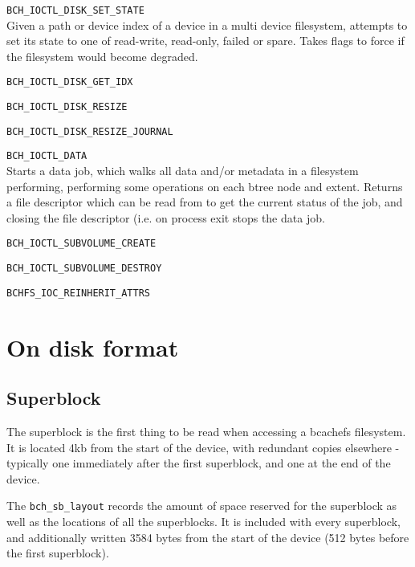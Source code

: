 \documentclass{article}
\begin{document}
\begin{description}
	\item \texttt{BCH\_IOCTL\_DISK\_SET\_STATE} \\
		Given a path or device index of a device in a multi device
		filesystem, attempts to set its state to one of read-write,
		read-only, failed or spare. Takes flags to force if the
		filesystem would become degraded.

	\item \texttt{BCH\_IOCTL\_DISK\_GET\_IDX} \\
	\item \texttt{BCH\_IOCTL\_DISK\_RESIZE} \\
	\item \texttt{BCH\_IOCTL\_DISK\_RESIZE\_JOURNAL} \\
	\item \texttt{BCH\_IOCTL\_DATA} \\
		Starts a data job, which walks all data and/or metadata in a
		filesystem performing, performing some operations on each btree
		node and extent. Returns a file descriptor which can be read
		from to get the current status of the job, and closing the file
		descriptor (i.e. on process exit stops the data job.

	\item \texttt{BCH\_IOCTL\_SUBVOLUME\_CREATE} \\
	\item \texttt{BCH\_IOCTL\_SUBVOLUME\_DESTROY} \\
	\item \texttt{BCHFS\_IOC\_REINHERIT\_ATTRS} \\
\end{description}

\section{On disk format}

\subsection{Superblock}

The superblock is the first thing to be read when accessing a bcachefs
filesystem. It is located 4kb from the start of the device, with redundant
copies elsewhere - typically one immediately after the first superblock, and one
at the end of the device.

The \texttt{bch\_sb\_layout} records the amount of space reserved for the
superblock as well as the locations of all the superblocks. It is included with
every superblock, and additionally written 3584 bytes from the start of the
device (512 bytes before the first superblock).
\end{document}
